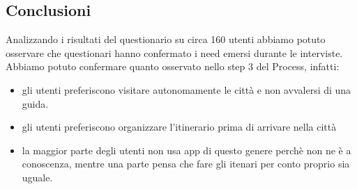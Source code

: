 \subsection{Conclusioni}

Analizzando i risultati del questionario su circa 160 utenti abbiamo potuto osservare che questionari hanno confermato i need emersi durante le interviste. Abbiamo potuto confermare quanto osservato nello step 3 del Process, infatti:

\begin{itemize}

	\item gli utenti preferiscono visitare autonomamente le città e non avvalersi di una guida.
	\item gli utenti preferiscono organizzare l'itinerario prima di arrivare nella città
	\item la maggior parte degli utenti non usa app di questo genere perchè non ne è a conoscenza, mentre una parte pensa che fare gli itenari per conto proprio sia uguale.

\end{itemize}